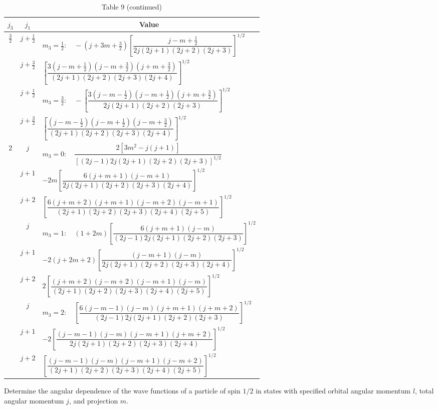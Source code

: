 \begin{table}[htbp]
\centering\scriptsize
\caption*{Table 9 (continued)}
\renewcommand{\arraystretch}{1.55}
\begin{tabular}{@{}c c l@{}}
\toprule
$j_3$ & $j_1$ & \multicolumn{1}{c}{Value}\\
\midrule
$\frac32$ & $j+\frac12$ & $m_3=\frac12:\quad -(j+3m+\frac32)\left[\dfrac{j-m+\frac12}{2j(2j+1)(2j+2)(2j+3)}\right]^{1/2}$\\
&$j+\frac32$&$\left[\dfrac{3(j-m+\frac12)(j-m+\frac32)(j+m+\frac32)}{(2j+1)(2j+2)(2j+3)(2j+4)}\right]^{1/2}$\\
&$j+\frac12$&$m_3=\frac32:\quad-\left[\dfrac{3(j-m-\frac12)(j-m+\frac12)(j+m+\frac32)}{2j(2j+1)(2j+2)(2j+3)}\right]^{1/2}$\\
&$j+\frac32$&$\left[\dfrac{(j-m-\frac12)(j-m+\frac12)(j-m+\frac32)}{(2j+1)(2j+2)(2j+3)(2j+4)}\right]^{1/2}$\\
\midrule
$2$&$j$&$m_3=0:\quad\dfrac{2[3m^2-j(j+1)]}{[(2j-1)2j(2j+1)(2j+2)(2j+3)]^{1/2}}$\\
&$j+1$&$-2m\left[\dfrac{6(j+m+1)(j-m+1)}{2j(2j+1)(2j+2)(2j+3)(2j+4)}\right]^{1/2}$\\
&$j+2$&$\left[\dfrac{6(j+m+2)(j+m+1)(j-m+2)(j-m+1)}{(2j+1)(2j+2)(2j+3)(2j+4)(2j+5)}\right]^{1/2}$\\
&$j$&$m_3=1:\quad(1+2m)\left[\dfrac{6(j+m+1)(j-m)}{(2j-1)2j(2j+1)(2j+2)(2j+3)}\right]^{1/2}$\\
&$j+1$&$-2(j+2m+2)\left[\dfrac{(j-m+1)(j-m)}{2j(2j+1)(2j+2)(2j+3)(2j+4)}\right]^{1/2}$\\
&$j+2$&$2\left[\dfrac{(j+m+2)(j-m+2)(j-m+1)(j-m)}{(2j+1)(2j+2)(2j+3)(2j+4)(2j+5)}\right]^{1/2}$\\
&$j$&$m_3=2:\quad\left[\dfrac{6(j-m-1)(j-m)(j+m+1)(j+m+2)}{(2j-1)2j(2j+1)(2j+2)(2j+3)}\right]^{1/2}$\\
&$j+1$&$-2\left[\dfrac{(j-m-1)(j-m)(j-m+1)(j+m+2)}{2j(2j+1)(2j+2)(2j+3)(2j+4)}\right]^{1/2}$\\
&$j+2$&$\left[\dfrac{(j-m-1)(j-m)(j-m+1)(j-m+2)}{(2j+1)(2j+2)(2j+3)(2j+4)(2j+5)}\right]^{1/2}$\\
\bottomrule
\end{tabular}
\end{table}

\ProblemHeading

Determine the angular dependence of the wave functions of a particle of spin $1/2$ in states with specified orbital angular momentum $l$, total angular momentum $j$, and projection $m$.

